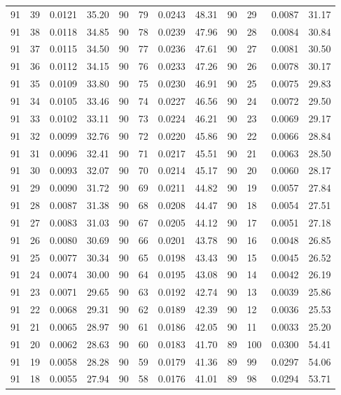 \begin{tabular}{llll|llll|llll}
91 & 39 & 0.0121 & 35.20 & 90 & 79 & 0.0243 & 48.31 & 90 & 29 & 0.0087 & 31.17\\
91 & 38 & 0.0118 & 34.85 & 90 & 78 & 0.0239 & 47.96 & 90 & 28 & 0.0084 & 30.84\\
91 & 37 & 0.0115 & 34.50 & 90 & 77 & 0.0236 & 47.61 & 90 & 27 & 0.0081 & 30.50\\
91 & 36 & 0.0112 & 34.15 & 90 & 76 & 0.0233 & 47.26 & 90 & 26 & 0.0078 & 30.17\\
91 & 35 & 0.0109 & 33.80 & 90 & 75 & 0.0230 & 46.91 & 90 & 25 & 0.0075 & 29.83\\
91 & 34 & 0.0105 & 33.46 & 90 & 74 & 0.0227 & 46.56 & 90 & 24 & 0.0072 & 29.50\\
91 & 33 & 0.0102 & 33.11 & 90 & 73 & 0.0224 & 46.21 & 90 & 23 & 0.0069 & 29.17\\
91 & 32 & 0.0099 & 32.76 & 90 & 72 & 0.0220 & 45.86 & 90 & 22 & 0.0066 & 28.84\\
91 & 31 & 0.0096 & 32.41 & 90 & 71 & 0.0217 & 45.51 & 90 & 21 & 0.0063 & 28.50\\
91 & 30 & 0.0093 & 32.07 & 90 & 70 & 0.0214 & 45.17 & 90 & 20 & 0.0060 & 28.17\\
91 & 29 & 0.0090 & 31.72 & 90 & 69 & 0.0211 & 44.82 & 90 & 19 & 0.0057 & 27.84\\
91 & 28 & 0.0087 & 31.38 & 90 & 68 & 0.0208 & 44.47 & 90 & 18 & 0.0054 & 27.51\\
91 & 27 & 0.0083 & 31.03 & 90 & 67 & 0.0205 & 44.12 & 90 & 17 & 0.0051 & 27.18\\
91 & 26 & 0.0080 & 30.69 & 90 & 66 & 0.0201 & 43.78 & 90 & 16 & 0.0048 & 26.85\\
91 & 25 & 0.0077 & 30.34 & 90 & 65 & 0.0198 & 43.43 & 90 & 15 & 0.0045 & 26.52\\
91 & 24 & 0.0074 & 30.00 & 90 & 64 & 0.0195 & 43.08 & 90 & 14 & 0.0042 & 26.19\\
91 & 23 & 0.0071 & 29.65 & 90 & 63 & 0.0192 & 42.74 & 90 & 13 & 0.0039 & 25.86\\
91 & 22 & 0.0068 & 29.31 & 90 & 62 & 0.0189 & 42.39 & 90 & 12 & 0.0036 & 25.53\\
91 & 21 & 0.0065 & 28.97 & 90 & 61 & 0.0186 & 42.05 & 90 & 11 & 0.0033 & 25.20\\
91 & 20 & 0.0062 & 28.63 & 90 & 60 & 0.0183 & 41.70 & 89 & 100 & 0.0300 & 54.41\\
91 & 19 & 0.0058 & 28.28 & 90 & 59 & 0.0179 & 41.36 & 89 & 99 & 0.0297 & 54.06\\
91 & 18 & 0.0055 & 27.94 & 90 & 58 & 0.0176 & 41.01 & 89 & 98 & 0.0294 & 53.71\\

\end{tabular}
